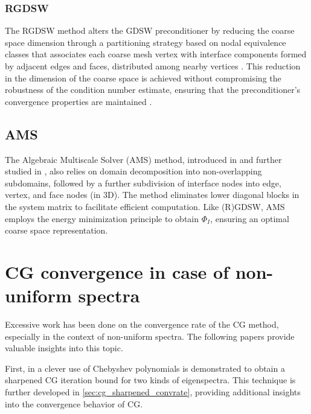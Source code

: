 \subsubsection{RGDSW}
The RGDSW method alters the GDSW preconditioner by reducing the coarse space dimension through a partitioning strategy based on nodal equivalence classes that associates each coarse mesh vertex with interface components formed by adjacent edges and faces, distributed among nearby vertices \cite{rgdsw_coarse_space_Dohrmann2017}. This reduction in the dimension of the coarse space is achieved without compromising the robustness of the condition number estimate, ensuring that the preconditioner's convergence properties are maintained \cite{argdsw_coarse_space_Heinlein2022}.

\subsection{AMS}
The Algebraic Multiscale Solver (AMS) method, introduced in \cite{msfvm_ams_Lunati2009,ams_framework_Wang2014} and further studied in \cite{ams_coarse_space_comp_study_Alves2024}, also relies on domain decomposition into non-overlapping subdomains, followed by a further subdivision of interface nodes into edge, vertex, and face nodes (in 3D). The method eliminates lower diagonal blocks in the system matrix to facilitate efficient computation. Like (R)GDSW, AMS employs the energy minimization principle to obtain $\Phi_I$, ensuring an optimal coarse space representation.

\section{CG convergence in case of non-uniform spectra}\label{sec:cg_nonuniform_spectra}
Excessive work has been done on the convergence rate of the CG method, especially in the context of non-uniform spectra. The following papers provide valuable insights into this topic.

First, in \cite{cg_sharpened_convrate_Axelsson1976} a clever use of Chebyshev polynomials is demonstrated to obtain a sharpened CG iteration bound for two kinds of eigenspectra. This technique is further developed in \cref{sec:cg_sharpened_convrate}, providing additional insights into the convergence behavior of CG.


